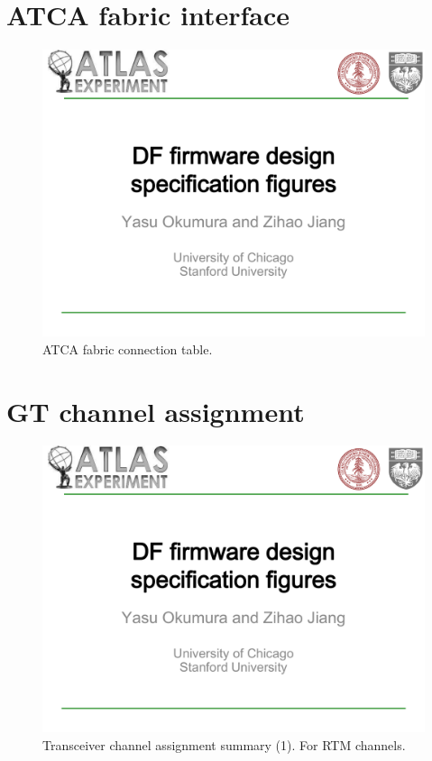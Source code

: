 \documentclass[11pt,letterpaper]{article}
\begin{document}
\section{ATCA fabric interface}
\begin{figure}[h!]
  \centering
  \includegraphics[width=1.0\textwidth,clip,page=16]{figures.pdf}
  \caption{ATCA fabric connection table.}
  \label{fig:ATCAFabricConnectionTable}
\end{figure}

\section{GT channel assignment}
\begin{figure}[h!]
  \centering
  \includegraphics[width=1.0\textwidth,clip,page=17]{figures.pdf}
  \caption{Transceiver channel assignment summary (1). For RTM channels.}
  \label{fig:GTChannel1}
\end{figure}
\end{document}
